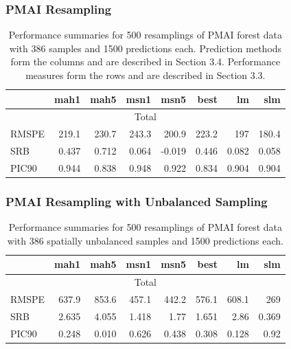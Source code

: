 \documentclass[mathserif,compress]{beamer}\usepackage{graphicx, color}
\begin{document}
\begin{frame}[fragile]
\frametitle{PMAI Resampling}

\begin{table}[ht]
\caption{\tiny Performance summaries for 500 resamplings of PMAI forest data with 386 samples and 1500 predictions each. Prediction methods form the columns and are described in Section 3.4.  Performance measures form the rows and are described in Section 3.3. \label{PMAIsummary}}
\scriptsize
\begin{center}
\begin{tabular}{|l r r r r r r r|}
\hline
\hline
  & mah1 & mah5 & msn1 & msn5 & best & lm & slm \\
\hline
\hline
\multicolumn{8}{|c|}{Total} \\
RMSPE & 219.1 & 230.7 & 243.3 & 200.9 & 223.2 & 197 & 180.4 \\
SRB & 0.437 & 0.712 & 0.064 & -0.019 & 0.446 & 0.082 & 0.058 \\
PIC90 & 0.944 & 0.838 & 0.948 & 0.922 & 0.834 & 0.904 & 0.904 \\
\hline
\end{tabular}
\end{center}
\end{table}%

\end{frame}


\begin{frame}[fragile]
\frametitle{PMAI Resampling with Unbalanced Sampling}

\begin{table}[ht]
\caption{\tiny Performance summaries for 500 resamplings of PMAI forest data with 386 spatially unbalanced samples and 1500 predictions each. \label{PREFsummary}}
\scriptsize
\begin{center}
\begin{tabular}{|l r r r r r r r|}
\hline
\hline
  & mah1 & mah5 & msn1 & msn5 & best & lm & slm \\
\hline
\hline
\multicolumn{8}{|c|}{Total} \\
RMSPE & 637.9 & 853.6 & 457.1 & 442.2 & 576.1 & 608.1 & 269 \\
SRB & 2.635 & 4.055 & 1.418 & 1.77 & 1.651 & 2.86 & 0.369 \\
PIC90 & 0.248 & 0.010 & 0.626 & 0.438 & 0.308 & 0.128 & 0.92 \\
\hline
\end{tabular}
\end{center}
\end{table}%
%

\end{frame}
\end{document}
